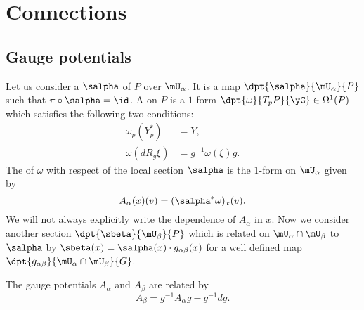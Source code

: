 \section{Connections}

\subsection{Gauge potentials}

Let us consider a  $\salpha$ of $P$ over $\mU_{\alpha}$. It is a map $\dpt{\salpha}{\mU_{\alpha}}{P}$ such that $\pi\circ\salpha=\id$. A  on $P$ is a $1$-form $\dpt{\omega}{T_pP}{\yG}\in\Omega^1(P)$ which satisfies the following two conditions:
\begin{subequations}
	\begin{align}
		\omega_p(Y^*_p) & =Y,   \label{conn_1}               \\
		\omega(dR_g\xi) & =g^{-1}\omega(\xi)g.\label{conn_2}
	\end{align}
\end{subequations}
The  of $\omega$ with respect of the local section\label{PgLocSecConn} $\salpha$ is  the $1$-form on $\mU_{\alpha}$ given by
\begin{equation}
	A_{\alpha}(x)(v)=(\salpha^*\omega)_x(v).
\end{equation}
We will not always explicitly write the dependence of $A_{\alpha}$ in $x$. Now we consider another section $\dpt{\sbeta}{\mU_{\beta}}{P}$ which is related on $\mU_{\alpha}\cap\mU_{\beta}$ to $\salpha$ by $\sbeta(x)=\salpha(x)\cdot g_{\alpha\beta}(x)$ for a well defined map $\dpt{g_{\alpha\beta}}{\mU_{\alpha}\cap\mU_{\beta}}{G}$.

\begin{proposition}
	The gauge potentials $A_{\alpha}$ and $A_{\beta}$ are related by
	\begin{equation}\label{trans_A}
		A_{\beta}=g^{-1} A_{\alpha} g-g^{-1} dg.
	\end{equation}
	\label{prop:trans_A}
\end{proposition}

